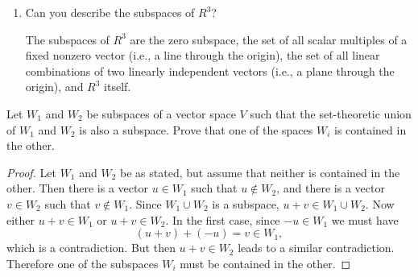 \begin{enumerate}
\begin{proof}
    Let $\alpha = (a_1,a_2)$ and $\beta = (b_1,b_2)$. Also let
    $\gamma = (c_1,c_2)$ be any element in $R^2$. Then $\gamma$ is a
    linear combination of $\alpha$ and $\beta$ if and only if the
    system of equations
    \begin{alignat*}{3}
      a_1x_1 &{}+{}& b_1x_2 &{}={}& c_1 \\
      a_2x_1 &{}+{}& b_2x_2 &{}={}& c_2
    \end{alignat*}
    has a solution. Suppose the coefficient matrix
    \begin{equation*}
      \begin{bmatrix}
        a_1 & b_1 \\
        a_2 & b_2
      \end{bmatrix}
    \end{equation*}
    is not invertible. By
    Exercise~\ref{exercise:lin-eq:2-by-2-inv-crit}, we then know that
    $a_1b_2 - a_2b_1 = 0$. Now, one of $a_1$ and $a_2$ is nonzero. If
    $a_1\neq0$, then
    \begin{equation*}
      b_2 = \frac{b_1}{a_1}\cdot a_2.
    \end{equation*}
    Also
    \begin{equation*}
      b_1 = \frac{b_1}{a_1}\cdot a_1,
    \end{equation*}
    and we have a contradiction since $\beta$ was assumed to not be a
    scalar multiple of $\alpha$. Similarly $a_2\neq0$ also leads to a
    contradiction. This shows that the system of equations above has a
    solution, so that $W = R^2$.
  \end{proof}
\item Can you describe the subspaces of $R^3$?
  \begin{solution}
    The subspaces of $R^3$ are the zero subspace, the set of all
    scalar multiples of a fixed nonzero vector (i.e., a line through
    the origin), the set of all linear combinations of two linearly
    independent vectors (i.e., a plane through the origin), and $R^3$
    itself.
  \end{solution}
\end{enumerate}

 Let $W_1$ and $W_2$ be subspaces of a vector space $V$ such
that the set-theoretic union of $W_1$ and $W_2$ is also a
subspace. Prove that one of the spaces $W_i$ is contained in the
other.
\begin{proof}
  Let $W_1$ and $W_2$ be as stated, but assume that neither is
  contained in the other. Then there is a vector $u\in W_1$ such that
  $u\not\in W_2$, and there is a vector $v\in W_2$ such that
  $v\not\in W_1$. Since $W_1\cup W_2$ is a subspace,
  $u + v\in W_1\cup W_2$. Now either $u+v\in W_1$ or $u+v\in W_2$. In
  the first case, since $-u\in W_1$ we must have
  \begin{equation*}
    (u+v)+(-u) = v \in W_1,
  \end{equation*}
  which is a contradiction. But then $u+v\in W_2$ leads to a similar
  contradiction. Therefore one of the subspaces $W_i$ must be
  contained in the other.
\end{proof}


